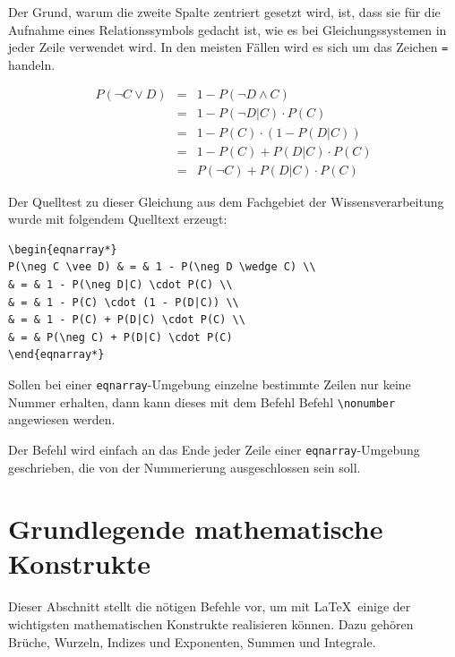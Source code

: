 \documentclass[a4paper,10pt,twoside]{scrbook}
\begin{document}
{Der Grund, warum die zweite Spalte zentriert gesetzt wird, ist, dass 
sie für die Aufnahme eines Relationssymbols gedacht ist, wie es bei 
Gleichungssystemen in jeder Zeile verwendet wird. In den meisten Fällen wird es sich um 
das Zeichen \verb!=! handeln. 

\begin{eqnarray*}
	P(\neg C \vee D) & = & 1 - P(\neg D \wedge C) \\
	& = & 1 - P(\neg D|C) \cdot P(C) \\
	& = & 1 - P(C) \cdot (1 - P(D|C)) \\
	& = & 1 - P(C) + P(D|C) \cdot P(C) \\		 
	& = & P(\neg C) + P(D|C) \cdot P(C)
\end{eqnarray*}

Der Quelltest zu dieser Gleichung aus dem Fachgebiet der
Wissensverarbeitung wurde mit folgendem Quelltext erzeugt:

\begin{lstlisting}[label=eqnarraybeispiel, style=customlatex]
\begin{eqnarray*}
P(\neg C \vee D) & = & 1 - P(\neg D \wedge C) \\
& = & 1 - P(\neg D|C) \cdot P(C) \\
& = & 1 - P(C) \cdot (1 - P(D|C)) \\
& = & 1 - P(C) + P(D|C) \cdot P(C) \\		 
& = & P(\neg C) + P(D|C) \cdot P(C)
\end{eqnarray*}
\end{lstlisting}


Sollen bei einer \verb!eqnarray!-Umgebung einzelne bestimmte Zeilen 
nur keine Nummer erhalten, dann
kann dieses mit dem Befehl Befehl \verb!\nonumber!
angewiesen werden. 


Der Befehl wird einfach an das Ende jeder Zeile einer 
\verb!eqnarray!-Umgebung geschrieben, die
von der Nummerierung ausgeschlossen sein soll.


\section{Grundlegende mathematische Konstrukte}

Dieser Abschnitt stellt die nötigen Befehle vor, um mit \LaTeX\ einige der wichtigsten 
mathematischen Konstrukte realisieren können. 
Dazu gehören Brüche, Wurzeln,
Indizes und Exponenten, Summen und Integrale.




}
\end{document}
